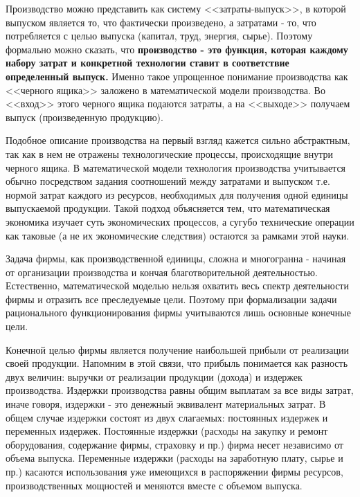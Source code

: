 \documentclass[12pt, 4paper]{book}
\begin{document}
{Производство можно представить как систему <<затраты-выпуск>>, в которой выпуском является то, что фактически произведено, а затратами - то, что потребляется с целью выпуска (капитал, труд, энергия, сырье). Поэтому формально можно сказать, что \textbf{производство - это функция, которая каждому набору затрат и конкретной технологии ставит в соответствие определенный выпуск.} Именно такое упрощенное понимание производства как <<черного ящика>> заложено в математической модели производства. Во <<вход>> этого черного ящика подаются затраты, а на <<выходе>> получаем выпуск (произведенную продукцию). 
\par

Подобное описание производства на первый взгляд кажется сильно абстрактным, так как в нем не отражены технологические процессы, происходящие внутри черного ящика. В математической модели технология производства учитывается обычно посредством задания соотношений между затратами и выпуском т.е. нормой затрат каждого из ресурсов, необходимых для получения одной единицы выпускаемой продукции. Такой подход объясняется тем, что математическая экономика изучает суть экономических процессов, а сугубо технические операции как таковые (а не их экономические следствия) остаются за рамками этой науки. 
\par

Задача фирмы, как производственной единицы, сложна и многогранна - начиная от организации производства и кончая благотворительной деятельностью. Естественно, математической моделью нельзя охватить весь спектр деятельности фирмы и отразить все преследуемые цели. Поэтому при формализации задачи рационального функционирования фирмы учитываются лишь основные конечные цели. 
\par

Конечной целью фирмы является получение наибольшей прибыли от реализации своей продукции. Напомним в этой связи, что прибыль понимается как разность двух величин: выручки от реализации продукции (дохода) и издержек производства. Издержки производства равны общим выплатам за все виды затрат, иначе говоря, издержки - это денежный эквивалент материальных затрат. В общем случае издержки состоят из двух слагаемых: постоянных издержек и переменных издержек. Постоянные издержки (расходы на закупку и ремонт оборудования, содержание фирмы, страховку и пр.) фирма несет независимо от объема выпуска. Переменные издержки (расходы на заработную плату, сырье и пр.) касаются использования уже имеющихся в распоряжении фирмы ресурсов, производственных мощностей и меняются вместе с объемом выпуска. 
\par

}
\end{document}
